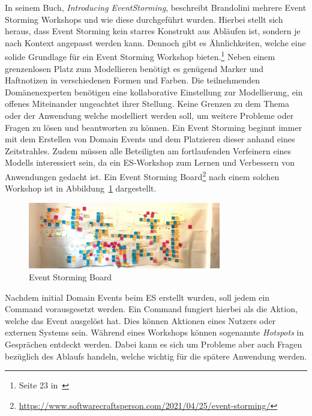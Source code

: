 In seinem Buch, \textit{Introducing EventStorming}, beschreibt Brandolini mehrere Event Storming Workshops und wie diese durchgeführt wurden.\cite*{introES}
Hierbei stellt sich heraus, dass Event Storming kein starres Konstrukt aus Abläufen ist, sondern je nach Kontext angepasst werden kann.
Dennoch gibt es Ähnlichkeiten, welche eine solide Grundlage für ein Event Storming Workshop bieten.\footnote{Seite 23 in~\cite*{introES}}
Neben einem grenzenlosen Platz zum Modellieren benötigt es genügend Marker und Haftnotizen in verschiedenen Formen und Farben.
Die teilnehmenden Domänenexperten benötigen eine kollaborative Einstellung zur Modellierung, ein offenes Miteinander ungeachtet ihrer Stellung.
Keine Grenzen zu dem Thema oder der Anwendung welche modelliert werden soll, um weitere Probleme oder Fragen zu lösen und beantworten zu können.
Ein Event Storming beginnt immer mit dem Erstellen von Domain Events und dem Platzieren dieser anhand eines Zeitstrahles.
Zudem müssen alle Beteiligten am fortlaufenden Verfeinern eines Modells interessiert sein, da ein \ac{ES}-Workshop zum Lernen und Verbessern
von Anwendungen gedacht ist.
Ein Event Storming Board\footnote{\url{https://www.softwarecraftsperson.com/2021/04/25/event-storming/}}
nach einem solchen Workshop ist in Abbildung~\ref{fig:rlBoard} dargestellt.

\begin{figure}[ht]
    \centering
    \includegraphics[width=0.75\textwidth]{images/2.1/event-storming}
    \caption{Event Storming Board}
    \label{fig:rlBoard}
\end{figure}

Nachdem initial Domain Events beim \ac{ES} erstellt wurden, soll jedem ein Command vorausgesetzt werden.
Ein Command fungiert hierbei als die Aktion, welche das Event ausgelöst hat.
Dies können Aktionen eines Nutzers oder externen Systems sein.
Während eines Workshops können sogenannte \textit{Hotspots} in Gesprächen entdeckt werden.
Dabei kann es sich um Probleme aber auch Fragen bezüglich des Ablaufs handeln, welche wichtig für die spätere Anwendung werden.

